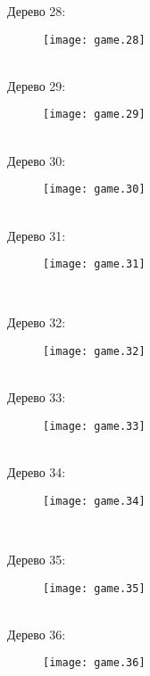 \documentclass[pdftex,12pt,a4paper]{article}
\begin{document}
Дерево 28: \\
\begin{figure}[htbp]
    \texttt{[image: game.28]}
\end{figure}\\

\newpage
Дерево 29: \\
\begin{figure}[htbp]
    \texttt{[image: game.29]}
\end{figure}\\

Дерево 30: \\
\begin{figure}[htbp]
    \texttt{[image: game.30]}
\end{figure}\\


Дерево 31: \\
\begin{figure}[htbp]
    \texttt{[image: game.31]}
\end{figure}\\

\newpage

Дерево 32: \\
\begin{figure}[htbp]
    \texttt{[image: game.32]}
\end{figure}\\


Дерево 33: \\
\begin{figure}[htbp]
    \texttt{[image: game.33]}
\end{figure}\\

Дерево 34: \\
\begin{figure}[htbp]
    \texttt{[image: game.34]}
\end{figure}\\

\newpage


Дерево 35: \\
\begin{figure}[htbp]
    \texttt{[image: game.35]}
\end{figure}\\

Дерево 36: \\
\begin{figure}[htbp]
    \texttt{[image: game.36]}
\end{figure}\\
\end{document}
